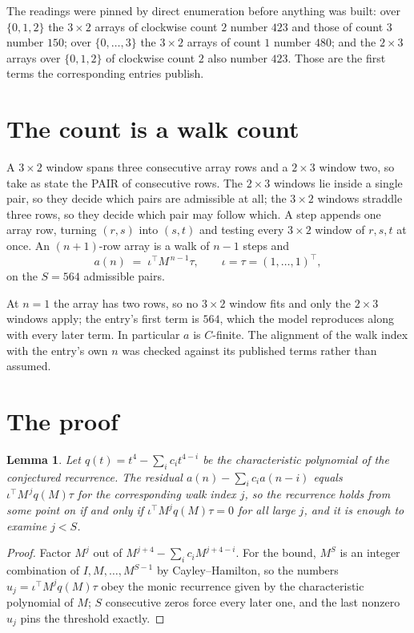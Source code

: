 \documentclass[11pt,a4paper]{article}
\theoremstyle{plain}
\newtheorem{lemma}[theorem]{Lemma}
\theoremstyle{definition}
\begin{document}
The readings were pinned by direct enumeration before anything was built: over
$\{0,1,2\}$ the $3\times2$ arrays of clockwise count $2$ number $423$ and those of count
$3$ number $150$; over $\{0,\dots,3\}$ the $3\times2$ arrays of count $1$ number $480$;
and the $2\times3$ arrays over $\{0,1,2\}$ of clockwise count $2$ also number $423$. Those
are the first terms the corresponding entries publish.

\section{The count is a walk count}

A $3\times2$ window spans three consecutive array rows and a $2\times3$
window two, so take as state the PAIR of consecutive rows. The $2\times3$ windows lie inside a
single pair, so they decide which pairs are admissible at all; the $3\times2$ windows straddle
three rows, so they decide which pair may follow which. A step appends one array row, turning
$(r,s)$ into $(s,t)$ and testing every $3\times2$ window of $r,s,t$ at once. An $(n+1)$-row
array is a walk of $n-1$ steps and
\[
a(n)\;=\;\iota^{\!\top}M^{\,n-1}\tau,\qquad\iota=\tau=(1,\dots,1)^{\!\top},
\]
on the $S=564$ admissible pairs.

At $n=1$ the array has two rows, so no $3\times2$ window fits and only the
$2\times3$ windows apply; the entry's first term is
$564$, which the model reproduces along with every later term.
In particular $a$ is $C$-finite. The alignment of the walk index with the entry's own $n$ was
checked against its published terms rather than assumed.

\section{The proof}

\begin{lemma}\label{lem:crit}
Let $q(t)=t^{4}-\sum_i c_it^{4-i}$ be the characteristic polynomial of the
conjectured recurrence. The residual $a(n)-\sum_ic_ia(n-i)$ equals
$\iota^{\!\top}M^{\,j}q(M)\tau$ for the corresponding walk index $j$, so the recurrence
holds from some point on if and only if $\iota^{\!\top}M^{j}q(M)\tau=0$ for all large $j$,
and it is enough to examine $j<S$.
\end{lemma}

\begin{proof}
Factor $M^{j}$ out of $M^{j+4}-\sum_ic_iM^{j+4-i}$. For the bound, $M^{S}$
is an integer combination of $I,M,\dots,M^{S-1}$ by Cayley--Hamilton, so the numbers
$u_j=\iota^{\!\top}M^{j}q(M)\tau$ obey the monic recurrence given by the characteristic
polynomial of $M$; $S$ consecutive zeros force every later one, and the last nonzero $u_j$
pins the threshold exactly.
\end{proof}
\end{document}
